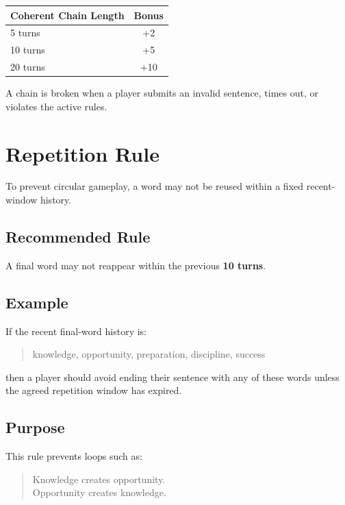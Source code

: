 \documentclass[11pt,a4paper]{article}
\begin{document}
\begin{center}
\begin{tabular}{lc}
\toprule
\textbf{Coherent Chain Length} & \textbf{Bonus} \\
\midrule
5 turns & +2 \\
10 turns & +5 \\
20 turns & +10 \\
\bottomrule
\end{tabular}
\end{center}

A chain is broken when a player submits an invalid sentence, times out, or violates the active rules.

\section{Repetition Rule}

To prevent circular gameplay, a word may not be reused within a fixed recent-window history.

\subsection{Recommended Rule}

A final word may not reappear within the previous \textbf{10 turns}.

\subsection{Example}

If the recent final-word history is:

\begin{quote}
knowledge, opportunity, preparation, discipline, success
\end{quote}

then a player should avoid ending their sentence with any of these words unless the agreed repetition window has expired.

\subsection{Purpose}

This rule prevents loops such as:

\begin{quote}
Knowledge creates opportunity.\\
Opportunity creates knowledge.
\end{quote}
\end{document}
